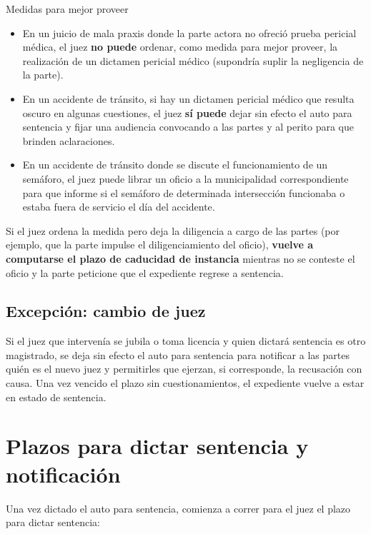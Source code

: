 \documentclass[12pt,oneside]{book}
\begin{document}
\begin{example}{Medidas para mejor proveer}
\begin{itemize}
    \item En un juicio de mala praxis donde la parte actora no ofreció prueba pericial médica, el juez \textbf{no puede} ordenar, como medida para mejor proveer, la realización de un dictamen pericial médico (supondría suplir la negligencia de la parte).
    \item En un accidente de tránsito, si hay un dictamen pericial médico que resulta oscuro en algunas cuestiones, el juez \textbf{sí puede} dejar sin efecto el auto para sentencia y fijar una audiencia convocando a las partes y al perito para que brinden aclaraciones.
    \item En un accidente de tránsito donde se discute el funcionamiento de un semáforo, el juez puede librar un oficio a la municipalidad correspondiente para que informe si el semáforo de determinada intersección funcionaba o estaba fuera de servicio el día del accidente.
\end{itemize}
\end{example}

\begin{important}
Si el juez ordena la medida pero deja la diligencia a cargo de las partes (por ejemplo, que la parte impulse el diligenciamiento del oficio), \textbf{vuelve a computarse el plazo de caducidad de instancia} mientras no se conteste el oficio y la parte peticione que el expediente regrese a sentencia.
\end{important}

\subsection{Excepción: cambio de juez}

Si el juez que intervenía se jubila o toma licencia y quien dictará sentencia es otro magistrado, se deja sin efecto el auto para sentencia para notificar a las partes quién es el nuevo juez y permitirles que ejerzan, si corresponde, la recusación con causa. Una vez vencido el plazo sin cuestionamientos, el expediente vuelve a estar en estado de sentencia.

\section{Plazos para dictar sentencia y notificación}

Una vez dictado el auto para sentencia, comienza a correr para el juez el plazo para dictar sentencia:
\end{document}
